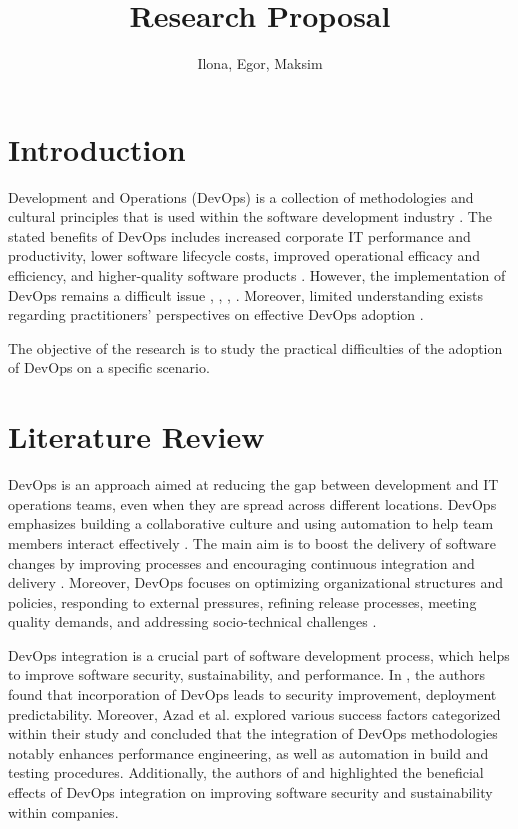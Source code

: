 \documentclass[oneside,final,12pt,a4paper]{extreport}
\title{Research Proposal}
\author{Ilona, Egor, Maksim}
\affil{Innopolis University}
\begin{document}
\maketitle

\newpage


\section{Introduction}

Development and Operations (DevOps) is a collection of methodologies and cultural principles that is used within the software development industry \cite{int1}. The stated benefits of DevOps includes increased corporate IT performance and productivity, lower software lifecycle costs, improved operational efficacy and efficiency, and higher-quality software products \cite{int1}. However, the implementation of DevOps remains a difficult issue \cite{int2}, \cite{8}, \cite{20}, \cite{14}. Moreover, limited understanding exists regarding practitioners' perspectives on effective DevOps adoption \cite{10}.

The objective of the research is to study the practical difficulties of the adoption of DevOps on a specific scenario.

\section{Literature Review}

DevOps is an approach aimed at reducing the gap between development and IT operations teams, even when they are spread across different locations. DevOps emphasizes building a collaborative culture and using automation to help team members interact effectively \cite{7}. The main aim is to boost the delivery of software changes by improving processes and encouraging continuous integration and delivery \cite{11}. Moreover, DevOps focuses on optimizing organizational structures and policies, responding to external pressures, refining release processes, meeting quality demands, and addressing socio-technical challenges \cite{7}.

DevOps integration is a crucial part of software development process, which helps to improve software security, sustainability, and performance. In \cite{7}, the authors found that incorporation of DevOps leads to security improvement, deployment predictability. Moreover, Azad et al. \cite{9} explored various success factors categorized within their study and concluded that the integration of DevOps methodologies notably enhances performance engineering, as well as automation in build and testing procedures. Additionally, the authors of \cite{12} and \cite{18} highlighted the beneficial effects of DevOps integration on improving software security and sustainability within companies. 
\end{document}
